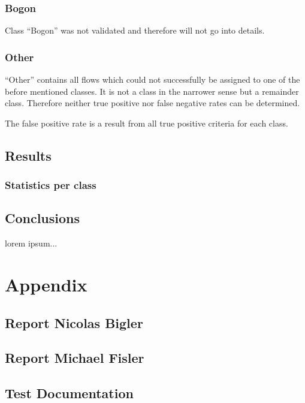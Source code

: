 \documentclass[a4paper]{scrartcl}
\begin{document}
\subsubsection{Bogon}
Class ``Bogon'' was not validated and therefore will not go into details.

\subsubsection{Other}
``Other'' contains all flows which could not successfully be assigned to one of the before mentioned classes. It is not a class in the narrower sense but a remainder class. Therefore neither true positive nor false negative rates can be determined.

The false positive rate is a result from all true positive criteria for each class.


\subsection{Results}
\subsubsection{Statistics per class}
\subsubsection{}
\subsection{Conclusions}

lorem ipsum...

\section{Appendix}

\subsection{Report Nicolas Bigler}

\subsection{Report Michael Fisler}

\subsection{Test Documentation}
\end{document}
